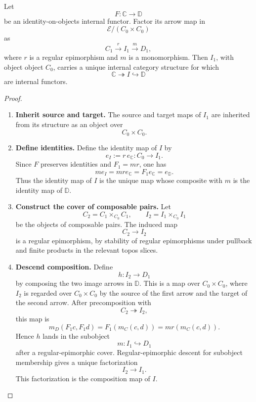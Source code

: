\begin{lemma}
\label{lem:to-identity-on-objects-regular-images}
    Let
    \[
        F:\mathbb C\to\mathbb D
    \]
    be an identity-on-objects internal functor. Factor its arrow map in
    \[
        \mathcal E/(C_0\times C_0)
    \]
    as
    \[
        C_1\xrightarrow{r}I_1\xrightarrow{m}D_1,
    \]
    where \(r\) is a regular epimorphism and \(m\) is a monomorphism. Then
    \(I_1\), with object object \(C_0\), carries a unique internal category
    structure for which
    \[
        \mathbb C\twoheadrightarrow I\hookrightarrow \mathbb D
    \]
    are internal functors.
\end{lemma}

\begin{proof}
    \leavevmode
    \begin{enumerate}
        \item \textbf{Inherit source and target.}
        The source and target maps of \(I_1\) are inherited from its structure
        as an object over
        \[
            C_0\times C_0.
        \]

        \item \textbf{Define identities.}
        Define the identity map of \(I\) by
        \[
            e_I:=r\,e_{\mathbb C}:C_0\to I_1.
        \]
        Since \(F\) preserves identities and \(F_1=mr\), one has
        \[
            me_I
            =
            mr e_{\mathbb C}
            =
            F_1e_{\mathbb C}
            =
            e_{\mathbb D}.
        \]
        Thus the identity map of \(I\) is the unique map whose composite with
        \(m\) is the identity map of \(\mathbb D\).

        \item \textbf{Construct the cover of composable pairs.}
        Let
        \[
            C_2=C_1\times_{C_0}C_1,
            \qquad
            I_2=I_1\times_{C_0}I_1
        \]
        be the objects of composable pairs. The induced map
        \[
            C_2\to I_2
        \]
        is a regular epimorphism, by stability of regular epimorphisms under
        pullback and finite products in the relevant topos slices.

        \item \textbf{Descend composition.}
        Define
        \[
            h:I_2\to D_1
        \]
        by composing the two image arrows in \(\mathbb D\). This is a map
        over \(C_0\times C_0\), where \(I_2\) is regarded over
        \(C_0\times C_0\) by the source of the first arrow and the target
        of the second arrow. After
        precomposition with
        \[
            C_2\twoheadrightarrow I_2,
        \]
        this map is
        \[
            m_D(F_1c,F_1d)
            =
            F_1(m_C(c,d))
            =
            mr(m_C(c,d)).
        \]
        Hence \(h\) lands in the subobject
        \[
            m:I_1\hookrightarrow D_1
        \]
        after a regular-epimorphic cover. Regular-epimorphic descent for
        subobject membership gives a unique factorization
        \[
            I_2\to I_1.
        \]
        This factorization is the composition map of \(I\).


\end{enumerate}
\end{proof}

